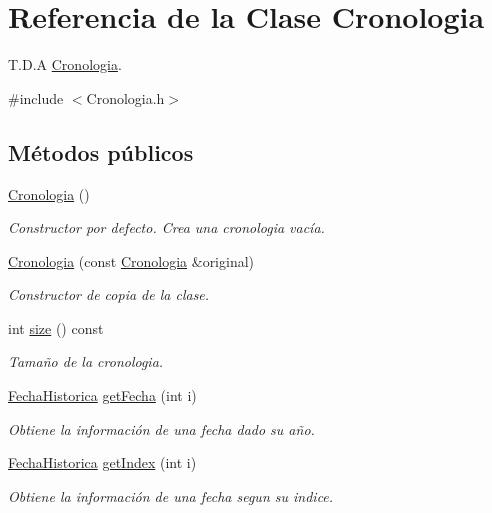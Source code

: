 \hypertarget{classCronologia}{}\section{Referencia de la Clase Cronologia}
\label{classCronologia}


T.\+D.\+A \hyperlink{classCronologia}{Cronologia}.  




{\ttfamily \#include $<$Cronologia.\+h$>$}

\subsection*{Métodos públicos}
\begin{DoxyCompactItemize}
\item 
\hyperlink{classCronologia_ac0026b1919148f6cd6cf4ca4c357771e}{Cronologia} ()
\begin{DoxyCompactList}\small\item\em Constructor por defecto. Crea una cronologia vacía. \end{DoxyCompactList}\item 
\hyperlink{classCronologia_a4de4592918375f3053acee2317dcc711}{Cronologia} (const \hyperlink{classCronologia}{Cronologia} \&original)
\begin{DoxyCompactList}\small\item\em Constructor de copia de la clase. \end{DoxyCompactList}\item 
int \hyperlink{classCronologia_a7eed0b6fa9ddacc5e439e01b00d49fca}{size} () const
\begin{DoxyCompactList}\small\item\em Tamaño de la cronologia. \end{DoxyCompactList}\item 
\hyperlink{classFechaHistorica}{Fecha\+Historica} \hyperlink{classCronologia_a35753d158bfc5abb68c4d28078772bf1}{get\+Fecha} (int i)
\begin{DoxyCompactList}\small\item\em Obtiene la información de una fecha dado su año. \end{DoxyCompactList}\item 
\hyperlink{classFechaHistorica}{Fecha\+Historica} \hyperlink{classCronologia_aaf114dc1d15b4c0032a782a0d8cb2c8c}{get\+Index} (int i)
\begin{DoxyCompactList}\small\item\em Obtiene la información de una fecha segun su indice. \end{DoxyCompactList}\item 

\end{DoxyCompactItemize}
